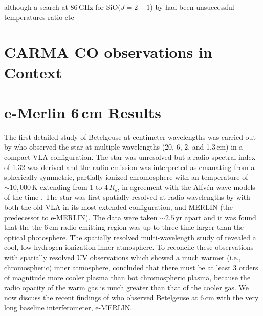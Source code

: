 although a search at 86\,GHz for SiO($J= 2-1$) by \cite{lambert_1978} had been unsuccessful
temperatures ratio etc 
\section{CARMA CO observations in Context}\label{sec:5.11}

\section{e-Merlin 6\,cm Results}\label{sec:5.12}
The first detailed study of Betelgeuse at centimeter wavelengths was carried out by \cite{newell_1982}
who observed the star at multiple wavelengths (20, 6, 2, and 1.3\,cm) in a compact VLA configuration. The star was unresolved but a radio spectral index of 1.32 was derived and the radio emission was interpreted as emanating from a spherically symmetric, partially ionized chromosphere with an temperature of  $\sim 10,000$\,K extending from 1 to 4\,$R_{\star}$, in agreement with the Alfv\'en wave models of the time \citep{hartmann_1984}. The star was first spatially resolved at radio wavelengths by \cite{skinner_1997} with both the old VLA in its most extended configuration, and MERLIN (the predecessor to e-MERLIN). The data were taken $\sim 2.5$\,yr apart and it was found that the the 6\,cm radio emitting region was up to three time larger than the optical photosphere. The spatially resolved multi-wavelength study of \cite{lim_1998} revealed a cool, low hydrogen ionization inner atmosphere. To reconcile these observations with spatially resolved UV observations which showed a much warmer (i.e., chromospheric) inner atmosphere, \cite{lim_1998} concluded that there must be at least 3 orders of magnitude more cooler plasma than hot chromospheric plasma, because the radio opacity of the warm gas is much greater than that of the cooler gas. We now discuss the recent findings of \cite{richards_2013} who observed Betelgeuse at 6\,cm with the very long baseline interferometer, e-MERLIN.

